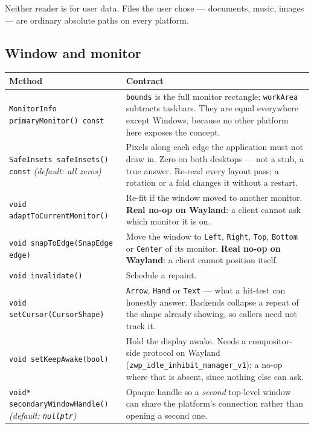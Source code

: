 \documentclass[11pt,a4paper]{article}
\begin{document}
Neither reader is for user data. Files the user chose --- documents, music,
images --- are ordinary absolute paths on every platform.

\subsection{Window and monitor}

\begin{longtable}{@{}p{}p{}@{}}
\toprule
\textbf{Method} & \textbf{Contract} \\
\midrule
\endhead
\texttt{MonitorInfo primaryMonitor() const} &
\texttt{bounds} is the full monitor rectangle; \texttt{workArea} subtracts
taskbars. They are equal everywhere except Windows, because no other platform
here exposes the concept. \\
\addlinespace
\texttt{SafeInsets safeInsets() const} \newline \emph{(default: all zeros)} &
Pixels along each edge the application must not draw in. Zero on both desktops
--- not a stub, a true answer. Re-read every layout pass; a rotation or a fold
changes it without a restart. \\
\addlinespace
\texttt{void adaptToCurrentMonitor()} &
Re-fit if the window moved to another monitor. \textbf{Real no-op on Wayland}:
a client cannot ask which monitor it is on. \\
\addlinespace
\texttt{void snapToEdge(SnapEdge edge)} &
Move the window to \texttt{Left}, \texttt{Right}, \texttt{Top},
\texttt{Bottom} or \texttt{Center} of its monitor. \textbf{Real no-op on
Wayland}: a client cannot position itself. \\
\addlinespace
\texttt{void invalidate()} &
Schedule a repaint. \\
\addlinespace
\texttt{void setCursor(CursorShape)} &
\texttt{Arrow}, \texttt{Hand} or \texttt{Text} --- what a hit-test can honestly
answer. Backends collapse a repeat of the shape already showing, so callers need
not track it. \\
\addlinespace
\texttt{void setKeepAwake(bool)} &
Hold the display awake. Needs a compositor-side protocol on Wayland
(\texttt{zwp\_idle\_inhibit\_manager\_v1}); a no-op where that is absent, since
nothing else can ask. \\
\addlinespace
\texttt{void* secondaryWindowHandle()} \newline \emph{(default:
\texttt{nullptr})} &
Opaque handle so a \emph{second} top-level window can share the platform's
connection rather than opening a second one. \\
\bottomrule
\end{longtable}
\end{document}
